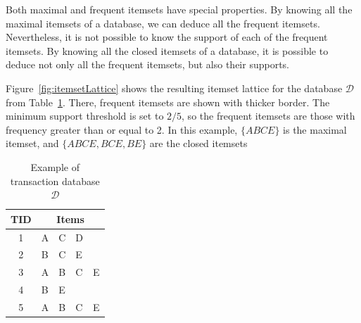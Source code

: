 Both maximal and frequent itemsets have special properties. By knowing all the maximal itemsets of a database, we
can deduce all the frequent itemsets. Nevertheless, it is not possible to know the support of each of the frequent
itemsets. By knowing all the closed itemsets of a database, it is possible to deduce not only all the frequent itemsets,
but also their supports.

Figure~\ref{fig:itemsetLattice} shows the resulting itemset lattice for the database $\mathcal{D}$
from Table~\ref{tab:itemsetLattice}. There, frequent itemsets are shown with thicker border. The minimum support
threshold is set to $2/5$, so the frequent itemsets are those with frequency greater than or equal to 2. In this
example, $\{ABCE\}$ is the maximal itemset, and $\{ABCE, BCE, BE\}$ are the closed itemsets 

\begin{table}[h!]
  \begin{center}
      \begin{tabular}{ c | l l l l }
      \toprule
      \textbf{TID} & \multicolumn{4}{c}{\textbf{Items}} \\
      \midrule
	1	& A & C & D & \\
	2 	& B & C & E & \\
	3	& A & B & C & E \\
	4 	& B & E &   & \\
	5	& A & B & C & E \\
      \bottomrule
      \end{tabular}
  \caption{Example of transaction database $\mathcal{D}$ \citep{Pasquier99efficientmining}}
  \label{tab:itemsetLattice}
 \end{center}
\end{table}


